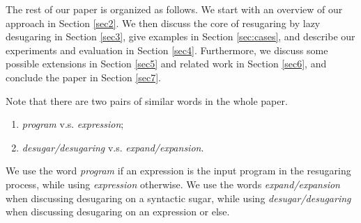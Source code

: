 The rest of our paper is organized as follows. We start with an overview of our approach in Section \ref{sec2}. We then discuss the core of resugaring by lazy desugaring in Section \ref{sec3}, give examples in Section \ref{sec:cases}, and describe our experiments and evaluation in Section \ref{sec4}. Furthermore, we discuss some possible extensions in Section \ref{sec5} and related work in Section \ref{sec6}, and conclude the paper in Section \ref{sec7}.

Note that there are two pairs of similar words in the whole paper.
\begin{enumerate}
	\item \emph{program} v.s. \emph{expression};
	\item \emph{desugar/desugaring} v.s. \emph{expand/expansion}.
\end{enumerate}
We use the word \emph{program} if an expression is the input program in the  resugaring process, while using \emph{expression} otherwise. We use the words \emph{expand/expansion} when discussing desugaring on a syntactic sugar, while using \emph{desugar/desugaring} when discussing desugaring on an expression or else.
